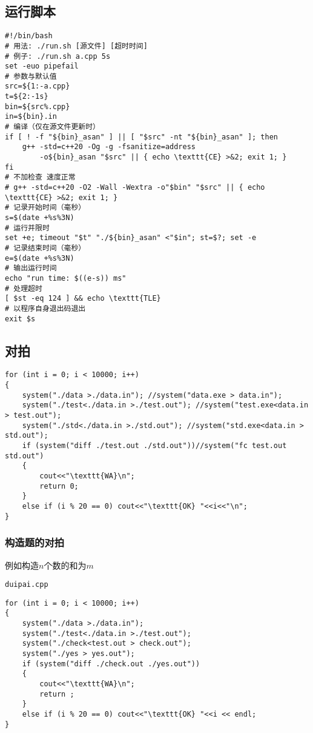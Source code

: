 \documentclass[a4paper, fontset=none]{ctexart}
\begin{document}
\subsection{运行脚本}
\begin{verbatim}
#!/bin/bash
# 用法: ./run.sh [源文件] [超时时间]
# 例子: ./run.sh a.cpp 5s
set -euo pipefail
# 参数与默认值
src=${1:-a.cpp}
t=${2:-1s}
bin=${src%.cpp}
in=${bin}.in
# 编译（仅在源文件更新时）
if [ ! -f "${bin}_asan" ] || [ "$src" -nt "${bin}_asan" ]; then
    g++ -std=c++20 -Og -g -fsanitize=address
        -o${bin}_asan "$src" || { echo \texttt{CE} >&2; exit 1; }
fi
# 不加检查 速度正常
# g++ -std=c++20 -O2 -Wall -Wextra -o"$bin" "$src" || { echo \texttt{CE} >&2; exit 1; }
# 记录开始时间（毫秒）
s=$(date +%s%3N)
# 运行并限时
set +e; timeout "$t" "./${bin}_asan" <"$in"; st=$?; set -e
# 记录结束时间（毫秒）
e=$(date +%s%3N)
# 输出运行时间
echo "run time: $((e-s)) ms"
# 处理超时
[ $st -eq 124 ] && echo \texttt{TLE}
# 以程序自身退出码退出
exit $s
\end{verbatim}
\subsection{对拍}

\begin{verbatim}
for (int i = 0; i < 10000; i++)
{
    system("./data >./data.in"); //system("data.exe > data.in");
    system("./test<./data.in >./test.out"); //system("test.exe<data.in > test.out");
    system("./std<./data.in >./std.out"); //system("std.exe<data.in > std.out");
    if (system("diff ./test.out ./std.out"))//system("fc test.out std.out")
    {
        cout<<"\texttt{WA}\n";
        return 0;
    }
    else if (i % 20 == 0) cout<<"\texttt{OK} "<<i<<"\n";
}
\end{verbatim}
\subsubsection{构造题的对拍}

例如构造$n$个数的和为$m$

\texttt{duipai.cpp}
\begin{verbatim}
for (int i = 0; i < 10000; i++)
{
    system("./data >./data.in");
    system("./test<./data.in >./test.out");
    system("./check<test.out > check.out");
    system("./yes > yes.out");
    if (system("diff ./check.out ./yes.out"))
    {
        cout<<"\texttt{WA}\n";
        return ;
    }
    else if (i % 20 == 0) cout<<"\texttt{OK} "<<i << endl;
}
\end{verbatim}
\end{document}
